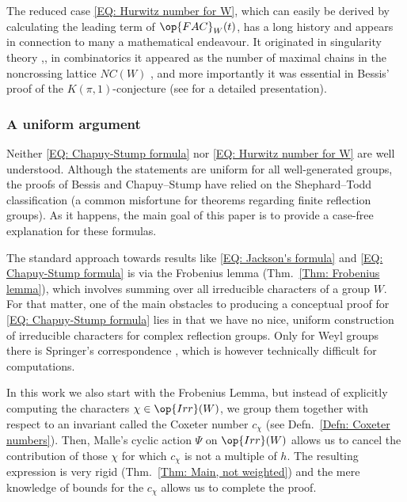 The reduced case \eqref{EQ: Hurwitz number for W}, which can easily be derived by calculating the leading term of $\op{FAC}_W(t)$, has a long history and appears in connection to many a mathematical endeavour. It originated in singularity theory \cite[Conj.~(3.5)]{looij-complement-bifurc},\cite{deligne-letter-to-looijenga,kluitmann-thesis}, in combinatorics it appeared as the number of maximal chains in the noncrossing lattice $NC(W)$ \cite[Prop.~9]{chapoton-enumerative-properties}, and more importantly it was essential in Bessis' proof of the $K(\pi,1)$-conjecture \cite{bes-kpi1} (see \cite[\S~1]{theo-thesis} for a detailed presentation).

\subsubsection*{A uniform argument}

Neither \eqref{EQ: Chapuy-Stump formula} nor \eqref{EQ: Hurwitz number for W} are well understood. Although the statements are uniform for all well-generated groups, the proofs of Bessis and Chapuy--Stump have relied on the Shephard--Todd classification (a common misfortune for theorems regarding finite reflection groups). As it happens, the main goal of this paper is to provide a case-free explanation for these formulas. 

The standard approach towards results like \eqref{EQ: Jackson's formula} and \eqref{EQ: Chapuy-Stump formula} is via the Frobenius lemma (Thm.~\ref{Thm: Frobenius lemma}), which involves summing over all irreducible characters of a group $W$. For that matter, one of the main obstacles to producing a conceptual proof for \eqref{EQ: Chapuy-Stump formula} lies in that we have no nice, uniform construction of irreducible characters for complex reflection groups. Only for Weyl groups there is Springer's correspondence \cite{springer-correspondence}, which is however technically difficult for computations. 

In this work we also start with the Frobenius Lemma, but instead of explicitly computing the characters $\chi\in\op{Irr}(W)$, we group them together with respect to an invariant called the Coxeter number $c_{\chi}$ (see Defn.~\ref{Defn: Coxeter numbers}). Then, Malle's cyclic action $\Psi$ on $\op{Irr}(W)$ allows us to cancel the contribution of those $\chi$ for which $c_{\chi}$ is not a multiple of $h$. The resulting expression is very rigid (Thm.~\ref{Thm: Main, not weighted}) and the mere knowledge of bounds for the $c_{\chi}$ allows us to complete the proof.

